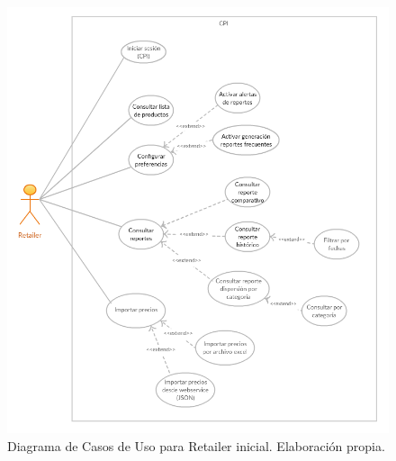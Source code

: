        \begin{figure}[H]
       \begin{center}
       \includegraphics[width=\textwidth]{cu_retailer_inicial.png}
       \caption{Diagrama de Casos de Uso para Retailer inicial. Elaboración propia.}
       \label{fig:cu_retailer_inicial}
       \end{center}
       \end{figure}


